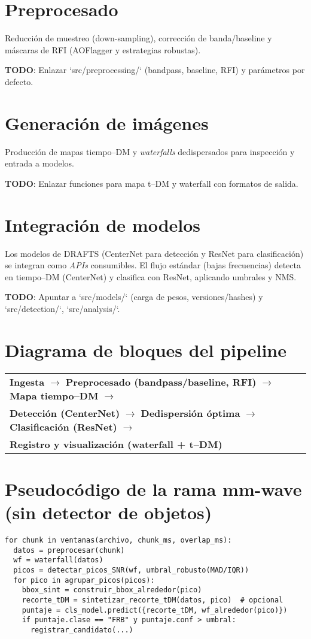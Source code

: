 \section{Preprocesado}
Reducción de muestreo (down-sampling), corrección de banda/baseline y máscaras de RFI (AOFlagger y estrategias robustas).

\textbf{TODO}: Enlazar `src/preprocessing/` (bandpass, baseline, RFI) y parámetros por defecto.

\section{Generación de imágenes}
Producción de mapas tiempo--DM y \textit{waterfalls} dedispersados para inspección y entrada a modelos.

\textbf{TODO}: Enlazar funciones para mapa t--DM y waterfall con formatos de salida.

\section{Integración de modelos}
Los modelos de DRAFTS (CenterNet para detección y ResNet para clasificación) se integran como \textit{APIs} consumibles. El flujo estándar (bajas frecuencias) detecta en tiempo--DM (CenterNet) y clasifica con ResNet, aplicando umbrales y NMS.

\textbf{TODO}: Apuntar a `src/models/` (carga de pesos, versiones/hashes) y `src/detection/`, `src/analysis/`.

\section{Diagrama de bloques del pipeline}
\begin{center}
\begin{tabular}{|p{}|}
\hline
\textbf{Ingesta} $\to$ \textbf{Preprocesado (bandpass/baseline, RFI)} $\to$ \textbf{Mapa tiempo--DM} $\to$ \\
\textbf{Detección (CenterNet)} $\to$ \textbf{Dedispersión óptima} $\to$ \textbf{Clasificación (ResNet)} $\to$ \\
\textbf{Registro y visualización (waterfall + t--DM)} \\
\hline
\end{tabular}
\end{center}

\section{Pseudocódigo de la rama mm-wave (sin detector de objetos)}
\begin{verbatim}
for chunk in ventanas(archivo, chunk_ms, overlap_ms):
  datos = preprocesar(chunk)
  wf = waterfall(datos)
  picos = detectar_picos_SNR(wf, umbral_robusto(MAD/IQR))
  for pico in agrupar_picos(picos):
    bbox_sint = construir_bbox_alrededor(pico)
    recorte_tDM = sintetizar_recorte_tDM(datos, pico)  # opcional
    puntaje = cls_model.predict({recorte_tDM, wf_alrededor(pico)})
    if puntaje.clase == "FRB" y puntaje.conf > umbral:
      registrar_candidato(...)
\end{verbatim}

